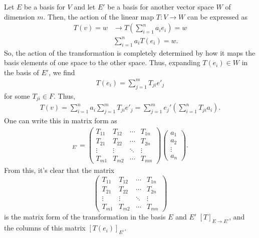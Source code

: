 Let $E$ be a basis for $V$ and let $E'$ be a basis for another vector space $W$ of dimension $m$. Then, the action of the linear map $T: V\rightarrow W$ can be expressed as
\begin{align}
    T(v) = w&\rightarrow T\left( \sum_{i=1}^n a_ie_i\right) = w\\
    & \sum_{i=1}^n a_i T(e_i) = w.
\end{align}
So, the action of the transformation is completely determined by how it maps the basis elements of one space to the other space. Thus, expanding $T(e_i)\in W$ in the basis of $E'$, we find
\begin{align}
    T(e_i) = \sum_{j=1}^m T_{ji} e'_j
\end{align}
for some $T_{ji}\in F$. Thus,
\begin{align}
    T(v) = \sum_{i=1}^n a_i \sum_{j=1}^m T_{ji}e'_j = \sum_{j=1}^m e_j'\left(\sum_{i=1}^n T_{ji}a_i\right).
\end{align}
One can write this in matrix form as
\begin{align}
    [T(v)]_{E'} = 
    \begin{pmatrix}
        T_{11} & T_{12} & \cdots & T_{1n} \\
        T_{21} & T_{22} & \cdots & T_{2n} \\
        \vdots & \vdots & \ddots & \vdots \\
        T_{m1} & T_{m2} & \cdots & T_{mn}
    \end{pmatrix}\begin{pmatrix}
        a_1\\
        a_2\\
        \vdots\\
        a_n
    \end{pmatrix}.
\end{align}
From this, it's clear that the matrix
\[
     \begin{pmatrix}
        T_{11} & T_{12} & \cdots & T_{1n} \\
        T_{21} & T_{22} & \cdots & T_{2n} \\
        \vdots & \vdots & \ddots & \vdots \\
        T_{m1} & T_{m2} & \cdots & T_{mn}
    \end{pmatrix}
\]
is the matrix form of the transformation in the basis $E$ and $E'$ $[T]_{E\rightarrow E'}$, and the columns of this matrix $[T(e_i)]_{E'}$.


